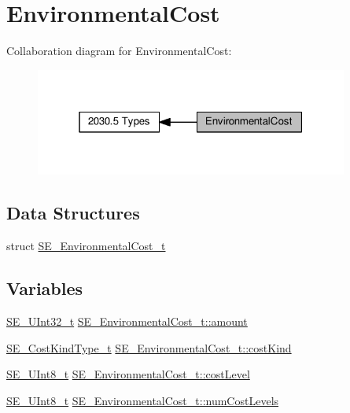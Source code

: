 \hypertarget{group__EnvironmentalCost}{}\section{Environmental\+Cost}
\label{group__EnvironmentalCost}
Collaboration diagram for Environmental\+Cost\+:\nopagebreak
\begin{figure}[H]
\begin{center}
\leavevmode
\includegraphics[width=292pt]{group__EnvironmentalCost}
\end{center}
\end{figure}
\subsection*{Data Structures}
\begin{DoxyCompactItemize}
\item 
struct \hyperlink{structSE__EnvironmentalCost__t}{S\+E\+\_\+\+Environmental\+Cost\+\_\+t}
\end{DoxyCompactItemize}
\subsection*{Variables}
\begin{DoxyCompactItemize}
\item 
\hyperlink{group__UInt32_ga70bd4ecda3c0c85d20779d685a270cdb}{S\+E\+\_\+\+U\+Int32\+\_\+t} \hyperlink{group__EnvironmentalCost_ga9fb61a220a4b7b3f677b34a19ddec1d2}{S\+E\+\_\+\+Environmental\+Cost\+\_\+t\+::amount}
\item 
\hyperlink{group__CostKindType_ga7a0a832ce8a138d7ba008379e83b718b}{S\+E\+\_\+\+Cost\+Kind\+Type\+\_\+t} \hyperlink{group__EnvironmentalCost_ga1aeeee701b58bf3a63ad13c43e7a75cd}{S\+E\+\_\+\+Environmental\+Cost\+\_\+t\+::cost\+Kind}
\item 
\hyperlink{group__UInt8_gaf7c365a1acfe204e3a67c16ed44572f5}{S\+E\+\_\+\+U\+Int8\+\_\+t} \hyperlink{group__EnvironmentalCost_ga886bd3034acbc87051b648e6b2242453}{S\+E\+\_\+\+Environmental\+Cost\+\_\+t\+::cost\+Level}
\item 
\hyperlink{group__UInt8_gaf7c365a1acfe204e3a67c16ed44572f5}{S\+E\+\_\+\+U\+Int8\+\_\+t} \hyperlink{group__EnvironmentalCost_ga47696c1d43b551dfb6cc492460500ea1}{S\+E\+\_\+\+Environmental\+Cost\+\_\+t\+::num\+Cost\+Levels}
\end{DoxyCompactItemize}


